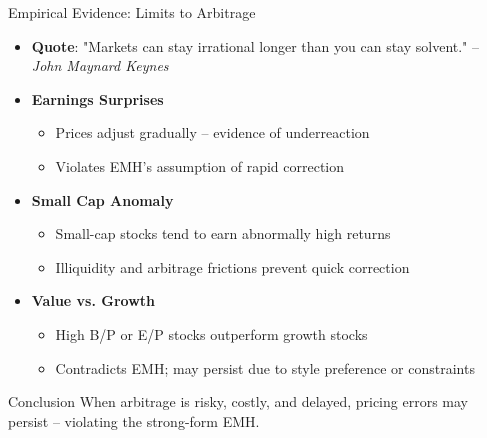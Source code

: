 \begin{frame}{Empirical Evidence: Limits to Arbitrage}
	
	\begin{itemize}
		\item \textbf{Quote}: "Markets can stay irrational longer than you can stay solvent." -- \textit{John Maynard Keynes}
		
		\item \textbf{Earnings Surprises}
		\begin{itemize}
			\item Prices adjust gradually -- evidence of underreaction
			\item Violates EMH's assumption of rapid correction
		\end{itemize}
		
		\item \textbf{Small Cap Anomaly}
		\begin{itemize}
			\item Small-cap stocks tend to earn abnormally high returns
			\item Illiquidity and arbitrage frictions prevent quick correction
		\end{itemize}
		
		\item \textbf{Value vs. Growth}
		\begin{itemize}
			\item High B/P or E/P stocks outperform growth stocks
			\item Contradicts EMH; may persist due to style preference or constraints
		\end{itemize}
	\end{itemize}
	
	\vspace{0.2cm}
	\begin{alertblock}{Conclusion}
		When arbitrage is risky, costly, and delayed, pricing errors may persist -- violating the strong-form EMH.
	\end{alertblock}
	
\end{frame}

